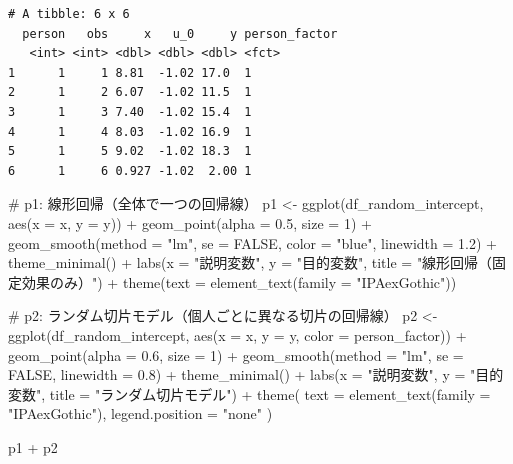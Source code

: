 \documentclass[
  a4paper,
]{ltjsbook}
\newenvironment{Shaded}{\begin{snugshade}}{\end{snugshade}}
\newcommand{\AttributeTok}[1]{\textcolor[rgb]{0.40,0.45,0.13}{#1}}
\newcommand{\CommentTok}[1]{\textcolor[rgb]{0.37,0.37,0.37}{#1}}
\newcommand{\ConstantTok}[1]{\textcolor[rgb]{0.56,0.35,0.01}{#1}}
\newcommand{\DecValTok}[1]{\textcolor[rgb]{0.68,0.00,0.00}{#1}}
\newcommand{\FloatTok}[1]{\textcolor[rgb]{0.68,0.00,0.00}{#1}}
\newcommand{\FunctionTok}[1]{\textcolor[rgb]{0.28,0.35,0.67}{#1}}
\newcommand{\NormalTok}[1]{\textcolor[rgb]{0.00,0.23,0.31}{#1}}
\newcommand{\OtherTok}[1]{\textcolor[rgb]{0.00,0.23,0.31}{#1}}
\newcommand{\SpecialCharTok}[1]{\textcolor[rgb]{0.37,0.37,0.37}{#1}}
\newcommand{\StringTok}[1]{\textcolor[rgb]{0.13,0.47,0.30}{#1}}
\begin{document}
\begin{verbatim}
# A tibble: 6 x 6
  person   obs     x   u_0     y person_factor
   <int> <int> <dbl> <dbl> <dbl> <fct>        
1      1     1 8.81  -1.02 17.0  1            
2      1     2 6.07  -1.02 11.5  1            
3      1     3 7.40  -1.02 15.4  1            
4      1     4 8.03  -1.02 16.9  1            
5      1     5 9.02  -1.02 18.3  1            
6      1     6 0.927 -1.02  2.00 1            
\end{verbatim}

\begin{Shaded}
\begin{Highlighting}[]
\CommentTok{\# p1: 線形回帰（全体で一つの回帰線）}
\NormalTok{p1 }\OtherTok{\textless{}{-}} \FunctionTok{ggplot}\NormalTok{(df\_random\_intercept, }\FunctionTok{aes}\NormalTok{(}\AttributeTok{x =}\NormalTok{ x, }\AttributeTok{y =}\NormalTok{ y)) }\SpecialCharTok{+}
    \FunctionTok{geom\_point}\NormalTok{(}\AttributeTok{alpha =} \FloatTok{0.5}\NormalTok{, }\AttributeTok{size =} \DecValTok{1}\NormalTok{) }\SpecialCharTok{+}
    \FunctionTok{geom\_smooth}\NormalTok{(}\AttributeTok{method =} \StringTok{"lm"}\NormalTok{, }\AttributeTok{se =} \ConstantTok{FALSE}\NormalTok{, }\AttributeTok{color =} \StringTok{"blue"}\NormalTok{, }\AttributeTok{linewidth =} \FloatTok{1.2}\NormalTok{) }\SpecialCharTok{+}
    \FunctionTok{theme\_minimal}\NormalTok{() }\SpecialCharTok{+}
    \FunctionTok{labs}\NormalTok{(}\AttributeTok{x =} \StringTok{"説明変数"}\NormalTok{, }\AttributeTok{y =} \StringTok{"目的変数"}\NormalTok{, }\AttributeTok{title =} \StringTok{"線形回帰（固定効果のみ）"}\NormalTok{) }\SpecialCharTok{+}
    \FunctionTok{theme}\NormalTok{(}\AttributeTok{text =} \FunctionTok{element\_text}\NormalTok{(}\AttributeTok{family =} \StringTok{"IPAexGothic"}\NormalTok{))}

\CommentTok{\# p2: ランダム切片モデル（個人ごとに異なる切片の回帰線）}
\NormalTok{p2 }\OtherTok{\textless{}{-}} \FunctionTok{ggplot}\NormalTok{(df\_random\_intercept, }\FunctionTok{aes}\NormalTok{(}\AttributeTok{x =}\NormalTok{ x, }\AttributeTok{y =}\NormalTok{ y, }\AttributeTok{color =}\NormalTok{ person\_factor)) }\SpecialCharTok{+}
    \FunctionTok{geom\_point}\NormalTok{(}\AttributeTok{alpha =} \FloatTok{0.6}\NormalTok{, }\AttributeTok{size =} \DecValTok{1}\NormalTok{) }\SpecialCharTok{+}
    \FunctionTok{geom\_smooth}\NormalTok{(}\AttributeTok{method =} \StringTok{"lm"}\NormalTok{, }\AttributeTok{se =} \ConstantTok{FALSE}\NormalTok{, }\AttributeTok{linewidth =} \FloatTok{0.8}\NormalTok{) }\SpecialCharTok{+}
    \FunctionTok{theme\_minimal}\NormalTok{() }\SpecialCharTok{+}
    \FunctionTok{labs}\NormalTok{(}\AttributeTok{x =} \StringTok{"説明変数"}\NormalTok{, }\AttributeTok{y =} \StringTok{"目的変数"}\NormalTok{, }\AttributeTok{title =} \StringTok{"ランダム切片モデル"}\NormalTok{) }\SpecialCharTok{+}
    \FunctionTok{theme}\NormalTok{(}
      \AttributeTok{text =} \FunctionTok{element\_text}\NormalTok{(}\AttributeTok{family =} \StringTok{"IPAexGothic"}\NormalTok{),}
      \AttributeTok{legend.position =} \StringTok{"none"}
\NormalTok{    )}

\NormalTok{p1 }\SpecialCharTok{+}\NormalTok{ p2}
\end{Highlighting}
\end{Shaded}
\end{document}
